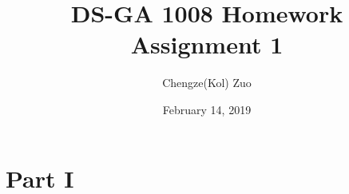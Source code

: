 \documentclass[12pt]{article}
\begin{document}
\author{Chengze(Kol) Zuo}
\title{DS-GA 1008 Homework Assignment 1}
\date{February 14, 2019}
\maketitle

\medskip


\section*{Part I}
\subsection*{}
\end{document}
